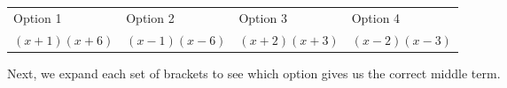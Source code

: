           \begin{table}[H]
        \begin{center}
      \label{m39394*id276099}
    \noindent
    \tabletail{%
      }
      \tablelasttail{}
      \begin{xtabular}[t]{|l|l|l|l|}\hline
        Option 1 &
        Option 2 &
        Option 3 &
        Option 4%
     \tabularnewline{}
                $\left(x+1\right)\left(x+6\right)$
               &
                $\left(x-1\right)\left(x-6\right)$
               &
                $\left(x+2\right)\left(x+3\right)$
               &
                $\left(x-2\right)\left(x-3\right)$
     \tabularnewline{}
    \end{xtabular}
      \end{center}
\end{table}
    \par
      \label{m39394*id276261}Next, we expand each set of brackets to see which option gives us the correct middle term.\par 
